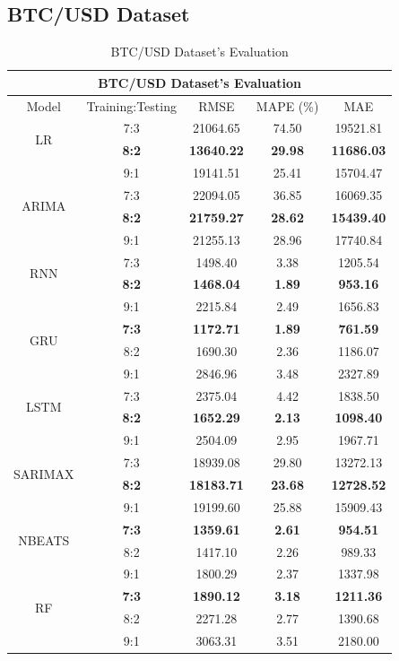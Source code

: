 \documentclass{ieeeojies}
\begin{document}
\subsection{BTC/USD Dataset}
\begin{table}[H]
	\centering
	\begin{tabular}{|c|c|c|c|c|}
		\hline
		\multicolumn{5}{|c|}{\textbf{BTC/USD Dataset's Evaluation}}\\
		\hline
		\centering Model & Training:Testing & RMSE & MAPE (\%) & MAE\\
		\hline
		\multirow{2}{*}{LR} & 7:3 & 21064.65 &  74.50 &  19521.81 \\ & \textbf{8:2} & \textbf{13640.22} &  \textbf{29.98} &  \textbf{11686.03} \\ & 9:1 & 19141.51 & 25.41 & 15704.47\\
		\hline
		\multirow{2}{*}{ARIMA} & 7:3 & 22094.05 & 36.85 & 16069.35 \\ & \textbf{8:2} & \textbf{21759.27}& \textbf{28.62} & \textbf{15439.40} \\ & 9:1 & 21255.13 & 28.96 & 17740.84\\
		\hline
		\multirow{2}{*}{RNN} & 7:3& 1498.40 &  3.38 & 1205.54\\ & \textbf{8:2}& \textbf{1468.04} & \textbf{1.89} & \textbf{953.16} \\ & 9:1 & 2215.84 & 2.49& 1656.83\\
		\hline
		\multirow{2}{*}{GRU} & \textbf{7:3}	&  \textbf{1172.71} & \textbf{1.89} & \textbf{761.59} \\ & 8:2 & 1690.30 & 2.36 &  1186.07 \\ & 9:1 & 2846.96  & 3.48 & 2327.89\\
		\hline
		\multirow{2}{*}{LSTM} & 7:3 &  2375.04 &  4.42 & 1838.50 \\ & \textbf{8:2} &  \textbf{1652.29} & \textbf{2.13} &  \textbf{1098.40} \\ & 9:1 & 2504.09  & 2.95 & 1967.71\\
		\hline
		\multirow{2}{*}{SARIMAX} & 7:3	& 18939.08 & 29.80 & 13272.13 \\ & \textbf{8:2} & \textbf{18183.71} & \textbf{23.68} & \textbf{12728.52} \\ & 9:1 & 19199.60 & 25.88 & 15909.43\\
		\hline
		\multirow{2}{*}{NBEATS} & \textbf{7:3} & \textbf{1359.61} & \textbf{2.61} & \textbf{954.51} \\ & 8:2 & 1417.10 & 2.26 & 989.33 \\ & 9:1 & 1800.29	& 2.37 & 1337.98 \\
		\hline
		\multirow{2}{*}{RF} & \textbf{7:3} & \textbf{1890.12} & \textbf{3.18} & \textbf{1211.36} \\ & 8:2 & 2271.28 & 2.77 & 1390.68 \\ & 9:1 & 3063.31 & 3.51 & 2180.00 \\
		\hline
	\end{tabular}
	\caption{BTC/USD Dataset's Evaluation}
	\label{btcresult}
\end{table}
\end{document}
